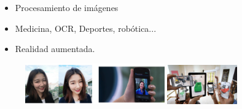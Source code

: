\documentclass[notes,slidesec,a4]{seminar}
\begin{document}
\begin{hslide}
	\begin{minipage}{5cm}
		\begin{itemize}
			\item Procesamiento de imágenes
			\item Medicina, OCR, Deportes, robótica...
			\item Realidad aumentada.
		\end{itemize}
	\end{minipage} \hfill
	\begin{minipage}{5cm}
		\begin{center}
			\begin{figure}
				\includegraphics[width=6.0cm]{img/face.png}
				\includegraphics[width=3.0cm]{img/ikea.jpg}
			\end{figure}
		\end{center}

	\end{minipage}
\end{hslide}

\end{document}
